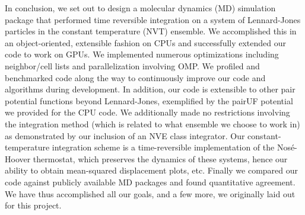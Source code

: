 \documentclass[12pt]{article}
\begin{document}
In conclusion, we set out to design a molecular dynamics (MD) simulation package that performed time reversible integration on a system of Lennard-Jones particles in the constant temperature (NVT) ensemble.  We accomplished this in an object-oriented, extensible fashion on CPUs and successfully extended our code to work on GPUs.  We implemented numerous optimizations including neighbor/cell lists and parallelization involving OMP.  We profiled and benchmarked code along the way to continuously improve our code and algorithms during development.  In addition, our code is extensible to other pair potential functions beyond Lennard-Jones, exemplified by the pairUF potential we provided for the CPU code.  We additionally made no restrictions involving the integration method (which is related to what ensemble we choose to work in) as demonstrated by our inclusion of an NVE class integrator.  Our constant-temperature integration scheme is a time-reversible implementation of the Nos\'{e}-Hoover thermostat, which preserves the dynamics of these systems, hence our ability to obtain mean-squared displacement plots, etc.  Finally we compared our code against publicly available MD packages and found quantitative agreement.  We have thus accomplished all our goals, and a few more, we originally laid out for this project.



\pagebreak


\end{document}
